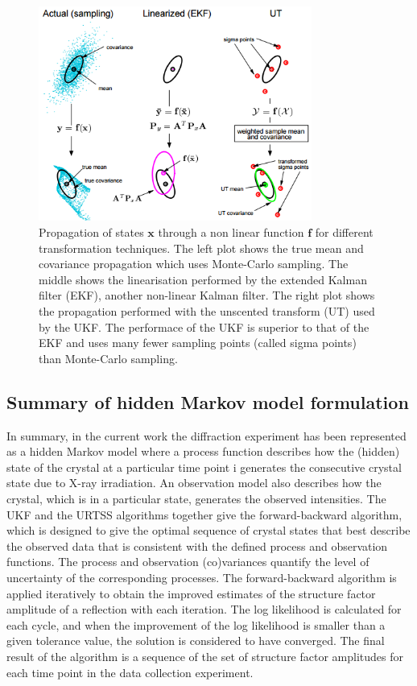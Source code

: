 \begin{figure}[ht!]
    \centering
    \includegraphics[width=0.8\textwidth]{figures/datared/StateTransformation.png}
    \caption{Propagation of states $\mathbf{x}$ through a non linear function $\mathbf{f}$ for different transformation techniques.
    The left plot shows the true mean and covariance propagation which uses Monte-Carlo sampling.
    The middle shows the linearisation performed by the extended Kalman filter (EKF), another non-linear Kalman filter.
    The right plot shows the propagation performed with the unscented transform (UT) used by the UKF.
    The performace of the UKF is superior to that of the EKF and uses many fewer sampling points (called sigma points) than Monte-Carlo sampling.}
    \label{fig:State propagation for different filters}
\end{figure}

\subsection{Summary of hidden Markov model formulation}
\label{sub:Summary of hidden Markov model formulation}
In summary, in the current work the diffraction experiment has been represented as a hidden Markov model where a process function describes how the (hidden) state of the crystal at a particular time point i generates the consecutive crystal state due to X-ray irradiation.
An observation model also describes how the crystal, which is in a particular state, generates the observed intensities.
The UKF and the URTSS algorithms together give the forward-backward algorithm, which is designed to give the optimal sequence of crystal states that best describe the observed data that is consistent with the defined process and observation functions.
The process and observation (co)variances quantify the level of uncertainty of the corresponding processes.
The forward-backward algorithm is applied iteratively to obtain the improved estimates of the structure factor amplitude of a reflection with each iteration.
The log likelihood is calculated for each cycle, and when the improvement of the log likelihood is smaller than a given tolerance value, the solution is considered to have converged.
The final result of the algorithm is a sequence of the set of structure factor amplitudes for each time point in the data collection experiment.
